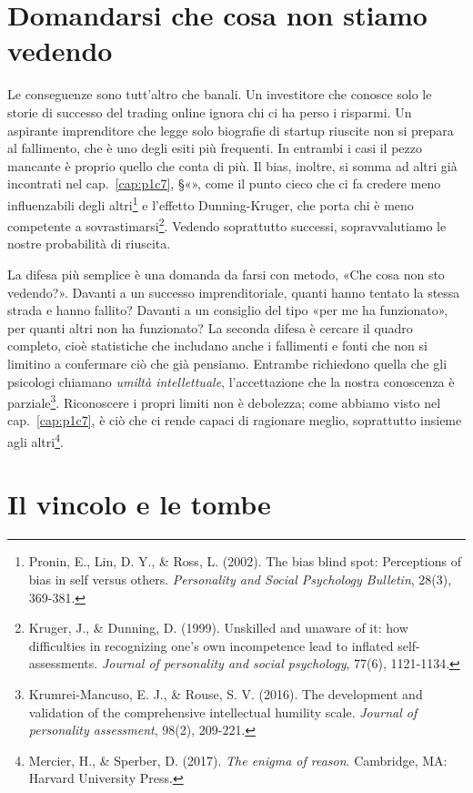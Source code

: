 \section{Domandarsi che cosa non stiamo vedendo}
\label{sec:p2c30-domandarsi-cosa-non}

Le conseguenze sono tutt'altro che banali. Un investitore che conosce solo le storie di successo del trading online ignora chi ci ha perso i risparmi. Un aspirante imprenditore che legge solo biografie di startup riuscite non si prepara al fallimento, che è uno degli esiti più frequenti. In entrambi i casi il pezzo mancante è proprio quello che conta di più. Il bias, inoltre, si somma ad altri già incontrati nel cap.~\ref{cap:p1c7}, §«», come il punto cieco che ci fa credere meno influenzabili degli altri\footnote{Pronin, E., Lin, D. Y., \& Ross, L. (2002). The bias blind spot: Perceptions of bias in self versus others. \textit{Personality and Social Psychology Bulletin}, 28(3), 369-381.} e l'effetto Dunning-Kruger, che porta chi è meno competente a sovrastimarsi\footnote{Kruger, J., \& Dunning, D. (1999). Unskilled and unaware of it: how difficulties in recognizing one's own incompetence lead to inflated self-assessments. \textit{Journal of personality and social psychology}, 77(6), 1121-1134.}. Vedendo soprattutto successi, sopravvalutiamo le nostre probabilità di riuscita.

La difesa più semplice è una domanda da farsi con metodo, «Che cosa non sto vedendo?». Davanti a un successo imprenditoriale, quanti hanno tentato la stessa strada e hanno fallito? Davanti a un consiglio del tipo «per me ha funzionato», per quanti altri non ha funzionato? La seconda difesa è cercare il quadro completo, cioè statistiche che includano anche i fallimenti e fonti che non si limitino a confermare ciò che già pensiamo. Entrambe richiedono quella che gli psicologi chiamano \textit{umiltà intellettuale}, l'accettazione che la nostra conoscenza è parziale\footnote{Krumrei-Mancuso, E. J., \& Rouse, S. V. (2016). The development and validation of the comprehensive intellectual humility scale. \textit{Journal of personality assessment}, 98(2), 209-221.}. Riconoscere i propri limiti non è debolezza; come abbiamo visto nel cap.~\ref{cap:p1c7}, è ciò che ci rende capaci di ragionare meglio, soprattutto insieme agli altri\footnote{Mercier, H., \& Sperber, D. (2017). \textit{The enigma of reason}. Cambridge, MA: Harvard University Press.}.

\section{Il vincolo e le tombe}
\label{sec:p2c30-l-alone-invisibile}

